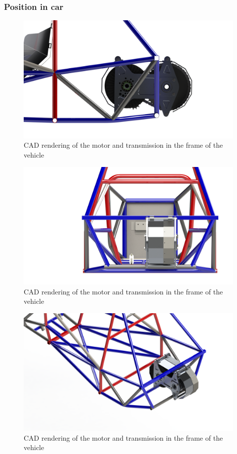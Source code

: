 \documentclass{article}
\begin{document}
\subsubsection{Position in car}

\begin{figure}[H]
    \centering
    \includegraphics[width = 0.8 \textwidth]{motor_side}
    \caption{CAD rendering of the motor and transmission in the frame of the vehicle}
    \label{motor_side}
\end{figure}

\begin{figure}[H]
    \centering
    \includegraphics[width = 0.8 \textwidth]{motor_rear}
    \caption{CAD rendering of the motor and transmission in the frame of the vehicle}
    \label{motor_rear}
\end{figure}

\begin{figure}[H]
    \centering
    \includegraphics[width = 0.8 \textwidth]{motor_iso}
    \caption{CAD rendering of the motor and transmission in the frame of the vehicle}
    \label{motor_iso}
\end{figure}
\end{document}

